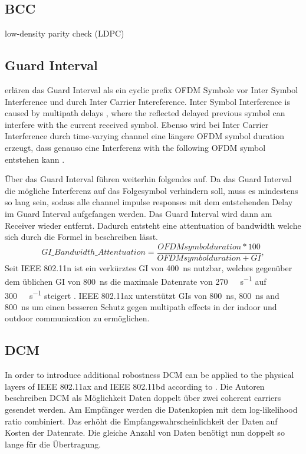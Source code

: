 \documentclass[]{nsm-thesis}
\begin{document}
\subsection{BCC}
low-density parity check (LDPC)
\subsection{Guard Interval}
\textcite{pulimamidi_development_2007} erlären das Guard Interval als ein cyclic prefix OFDM Symbole vor Inter Symbol Interference und durch Inter Carrier Intereference. Inter Symbol Interference is caused by multipath delays , where the reflected delayed previous symbol can interfere with the current received symbol\cite{ravindranath_performance_2016}. Ebenso wird bei Inter Carrier Interference durch time-varying channel eine längere OFDM symbol duration erzeugt, dass genauso eine Interferenz with the following OFDM symbol entstehen kann \cite{van_duc_nguyen_intercarrier_2002}.

Über das Guard Interval führen \textcite{pulimamidi_development_2007} weiterhin folgendes auf. 
Da das Guard Interval die mögliche Interferenz auf das Folgesymbol verhindern soll, muss es mindestens so lang sein, sodass alle channel impulse responses mit dem entstehenden Delay im Guard Interval aufgefangen werden. 
Das Guard Interval wird dann am Receiver wieder entfernt. Dadurch entsteht eine attentuation of bandwidth welche sich durch die Formel in beschreiben lässt. 
\begin{equation}\label{eq:GI}
	GI\_Bandwidth\_Attentuation =
	\frac{
		OFDM symbol duration * 100
	}{
		OFDM symbol duration + GI
	}
	,
\end{equation}
Seit IEEE 802.11n ist ein verkürztes \ac{GI} von  \SI{400}{\nano\second} nutzbar, welches gegenüber dem üblichen \ac{GI} von  \SI{800}{\nano\second} die  maximale Datenrate von \SI{270}{\mega\bit\per\second} auf \SI{300}{\mega\bit\per\second} steigert \cite{sauter_wireless_2022}. IEEE 802.11ax unterstützt \ac{GI}s von \SI{800}{\nano\second}, \SI{800}{\nano\second} and \SI{800}{\nano\second} um einen besseren Schutz gegen  multipath effects in der indoor und outdoor communication zu ermöglichen. 
\subsection{\ac{DCM}}
In order to introduce additional robostness \ac{DCM} can be applied to the physical layers of IEEE 802.11ax and IEEE 802.11bd according to \textcite{jacobs}. Die Autoren beschreiben \ac{DCM} als Möglichkeit Daten doppelt über zwei coherent carriers gesendet werden. Am Empfänger werden die Datenkopien mit dem log-likelihood ratio combiniert. Das erhöht die Empfangswahrscheinlichkeit der Daten auf Kosten der Datenrate. Die gleiche Anzahl von Daten benötigt nun doppelt so lange für die Übertragung. 
\end{document}
